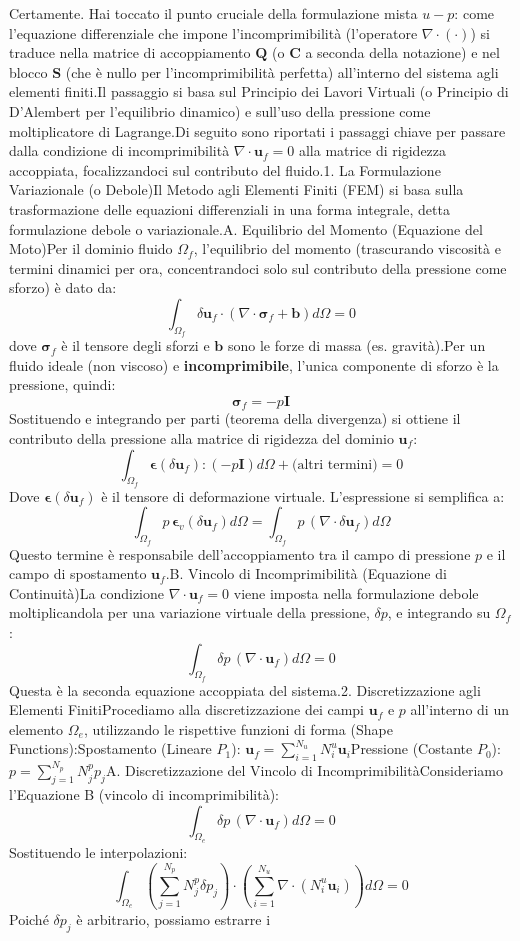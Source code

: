 \documentclass{article}
\begin{document}
Certamente. Hai toccato il punto cruciale della formulazione mista $u-p$: come l'equazione differenziale che impone l'incomprimibilità (l'operatore $\nabla \cdot (\cdot)$) si traduce nella matrice di accoppiamento $\mathbf{Q}$ (o $\mathbf{C}$ a seconda della notazione) e nel blocco $\mathbf{S}$ (che è nullo per l'incomprimibilità perfetta) all'interno del sistema agli elementi finiti.Il passaggio si basa sul Principio dei Lavori Virtuali (o Principio di D'Alembert per l'equilibrio dinamico) e sull'uso della pressione come moltiplicatore di Lagrange.Di seguito sono riportati i passaggi chiave per passare dalla condizione di incomprimibilità $\nabla \cdot \mathbf{u}_f = 0$ alla matrice di rigidezza accoppiata, focalizzandoci sul contributo del fluido.1. La Formulazione Variazionale (o Debole)Il Metodo agli Elementi Finiti (FEM) si basa sulla trasformazione delle equazioni differenziali in una forma integrale, detta formulazione debole o variazionale.A. Equilibrio del Momento (Equazione del Moto)Per il dominio fluido $\Omega_f$, l'equilibrio del momento (trascurando viscosità e termini dinamici per ora, concentrandoci solo sul contributo della pressione come sforzo) è dato da:$$\int_{\Omega_f} \delta \mathbf{u}_f \cdot \left( \nabla \cdot \mathbf{\sigma}_f + \mathbf{b} \right) d\Omega = 0$$dove $\mathbf{\sigma}_f$ è il tensore degli sforzi e $\mathbf{b}$ sono le forze di massa (es. gravità).Per un fluido ideale (non viscoso) e \textbf{incomprimibile}, l'unica componente di sforzo è la pressione, quindi:$$\mathbf{\sigma}_f = -p \mathbf{I}$$Sostituendo e integrando per parti (teorema della divergenza) si ottiene il contributo della pressione alla matrice di rigidezza del dominio $\mathbf{u}_f$:$$\int_{\Omega_f} \mathbf{\epsilon}(\delta \mathbf{u}_f) : (-p \mathbf{I}) d\Omega + \text{(altri termini)} = 0$$Dove $\mathbf{\epsilon}(\delta \mathbf{u}_f)$ è il tensore di deformazione virtuale. L'espressione si semplifica a:$$\int_{\Omega_f} p \, \mathbf{\epsilon}_v(\delta \mathbf{u}_f) d\Omega = \int_{\Omega_f} p \, (\nabla \cdot \delta \mathbf{u}_f) d\Omega$$Questo termine è responsabile dell'accoppiamento tra il campo di pressione $p$ e il campo di spostamento $\mathbf{u}_f$.B. Vincolo di Incomprimibilità (Equazione di Continuità)La condizione $\nabla \cdot \mathbf{u}_f = 0$ viene imposta nella formulazione debole moltiplicandola per una variazione virtuale della pressione, $\delta p$, e integrando su $\Omega_f$:$$\int_{\Omega_f} \delta p \, (\nabla \cdot \mathbf{u}_f) d\Omega = 0$$Questa è la seconda equazione accoppiata del sistema.2. Discretizzazione agli Elementi FinitiProcediamo alla discretizzazione dei campi $\mathbf{u}_f$ e $p$ all'interno di un elemento $\Omega_e$, utilizzando le rispettive funzioni di forma (Shape Functions):Spostamento (Lineare $P_1$): $\mathbf{u}_f = \sum_{i=1}^{N_u} N_i^u \mathbf{u}_i$Pressione (Costante $P_0$): $p = \sum_{j=1}^{N_p} N_j^p p_j$A. Discretizzazione del Vincolo di IncomprimibilitàConsideriamo l'Equazione B (vincolo di incomprimibilità):$$\int_{\Omega_e} \delta p \, (\nabla \cdot \mathbf{u}_f) d\Omega = 0$$Sostituendo le interpolazioni:$$\int_{\Omega_e} \left( \sum_{j=1}^{N_p} N_j^p \delta p_j \right) \cdot \left( \sum_{i=1}^{N_u} \nabla \cdot (N_i^u \mathbf{u}_i) \right) d\Omega = 0$$Poiché $\delta p_j$ è arbitrario, possiamo estrarre i 
\end{document}
